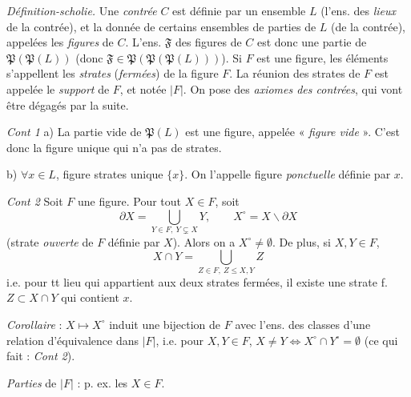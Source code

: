 \documentclass[11pt,a4paper]{article}
\begin{document}
\emph{Définition-scholie.} Une \emph{contrée} $C$ est définie par un ensemble $L$ (l'ens. des \emph{lieux} de la contrée), et la donnée de certains ensembles de parties de $L$ (de la contrée), appelées les \emph{figures} de $C$. L'ens. $\mathfrak{F}$ des figures de $C$ est donc une partie de $\mathfrak{P}(\mathfrak{P}(L))$ (donc $\mathfrak{F} \in \mathfrak{P}(\mathfrak{P}(\mathfrak{P}(L)))$). Si $F$ est une figure,  les éléments  s'appellent les \emph{strates} (\emph{fermées}) de la figure $F$. La réunion des strates  de $F$ est appelée le \emph{support} de $F$, et notée $|F|$. On pose des \emph{axiomes des contrées}, qui vont être dégagés par la suite.

\emph{Cont 1}  a) La partie vide de $\mathfrak{P}(L)$ est une figure, appelée « \emph{figure vide} ». C'est donc la figure unique qui n'a pas de strates.

b) $\forall x \in L$,   figure \ill{}  strates unique $\{x\}$. On l'appelle figure \emph{ponctuelle} définie par $x$.

\emph{Cont 2} \quad Soit $F$ une figure.  Pour tout $X \in F$,  soit
\[
  \partial X = \bigcup_{Y \in F,\ Y \subsetneq X} Y, \qquad X^{\circ} = X \smallsetminus \partial X
\]
(strate \emph{ouverte} de $F$ définie par $X$). Alors on a $X^{\circ} \neq \emptyset$. De plus, si $X, Y \in F$,
\[
  X \cap Y = \bigcup_{Z \in F,\ Z \leq X, Y} Z
\]
i.e.  pour tt  lieu qui appartient aux deux strates fermées,  il existe une strate f. $Z \subset X \cap Y$  qui contient $x$.

\emph{Corollaire}   : $X \mapsto X^{\circ}$ induit une bijection de $F$ avec l'ens. des classes d'une relation d'équivalence dans $|F|$, i.e. pour $X, Y \in F$,   $X \neq Y \Leftrightarrow X^{\circ} \cap Y^{\circ} = \emptyset$ (ce qui \ill{} fait : \emph{Cont 2}).

\emph{Parties } de $|F|$ : p. ex. les $X \in F$.
\end{document}
